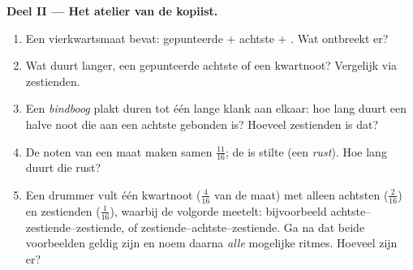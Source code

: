 \begin{problem}
\medskip
\noindent\textbf{Deel II --- Het atelier van de kopiist.}
\begin{enumerate}[resume]
  \item Een vierkwartsmaat bevat: gepunteerde  $+$ achtste $+$ . Wat
        ontbreekt er?
  \item Wat duurt langer, een gepunteerde achtste of een kwartnoot? Vergelijk via
        zestienden.
  \item Een \emph{bindboog} plakt duren tot één lange klank aan elkaar: hoe lang
        duurt een halve noot die aan een achtste gebonden is? Hoeveel zestienden
        is dat?
  \item De noten van een maat maken samen $\frac{11}{16}$; de  is stilte (een
        \emph{rust}). Hoe lang duurt die rust?
  \item Een drummer vult één kwartnoot ($\frac{4}{16}$ van de maat) met alleen
        achtsten ($\frac{2}{16}$) en zestienden ($\frac{1}{16}$), waarbij de
        volgorde meetelt: bijvoorbeeld achtste--zestiende--zestiende, of
        zestiende--achtste--zestiende. Ga na dat beide voorbeelden geldig zijn en
        noem daarna \emph{alle} mogelijke ritmes. Hoeveel zijn er?
\end{enumerate}


\end{problem}

